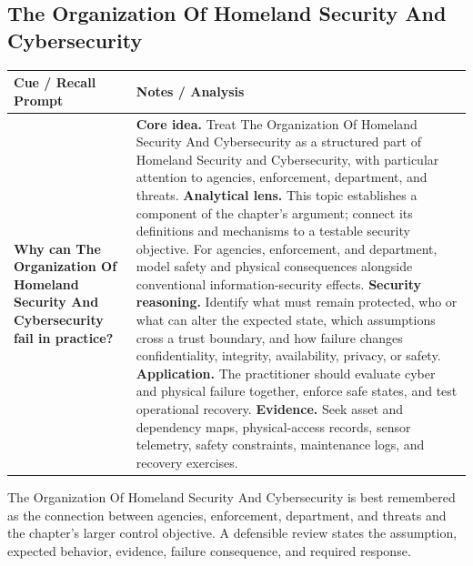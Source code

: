 \documentclass[11pt]{article}
\newcommand{\CornellHeader}{%
\rowcolor{Navy}\color{white}\bfseries Cue / Recall Prompt & \color{white}\bfseries Notes / Analysis\\\hline}
\newcommand{\CornellRow}[2]{%
\cellcolor{CueGray}\RaggedRight\textbf{#1} & \RaggedRight #2\\\hline}
\begin{document}
\subsection*{The Organization Of Homeland Security And Cybersecurity}
\begin{longtable}{>{\RaggedRight\arraybackslash}p{}|>{\RaggedRight\arraybackslash}p{}}
\CornellHeader
\CornellRow{Why can The Organization Of Homeland Security And Cybersecurity fail in practice?}{\textbf{Core idea.} Treat The Organization Of Homeland Security And Cybersecurity as a structured part of Homeland Security and Cybersecurity, with particular attention to agencies, enforcement, department, and threats. \textbf{Analytical lens.} This topic establishes a component of the chapter's argument; connect its definitions and mechanisms to a testable security objective. For agencies, enforcement, and department, model safety and physical consequences alongside conventional information-security effects. \textbf{Security reasoning.} Identify what must remain protected, who or what can alter the expected state, which assumptions cross a trust boundary, and how failure changes confidentiality, integrity, availability, privacy, or safety. \textbf{Application.} The practitioner should evaluate cyber and physical failure together, enforce safe states, and test operational recovery. \textbf{Evidence.} Seek asset and dependency maps, physical-access records, sensor telemetry, safety constraints, maintenance logs, and recovery exercises.}
\end{longtable}
\begin{topicsummary}
The Organization Of Homeland Security And Cybersecurity is best remembered as the connection between agencies, enforcement, department, and threats and the chapter's larger control objective. A defensible review states the assumption, expected behavior, evidence, failure consequence, and required response.
\end{topicsummary}
\end{document}

